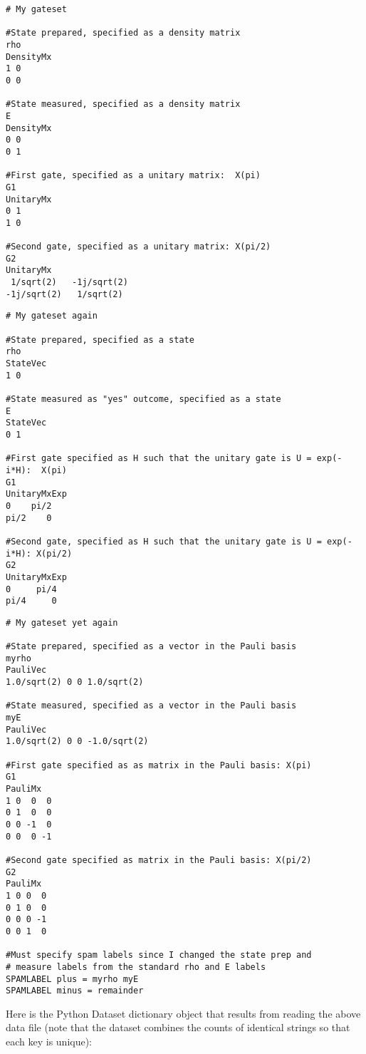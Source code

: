 \documentclass{article}[11pt]
\begin{document}
\begin{itemize}
\begin{lstlisting}[frame=single,caption=First example gate set file]
# My gateset

#State prepared, specified as a density matrix
rho
DensityMx
1 0
0 0

#State measured, specified as a density matrix
E
DensityMx
0 0
0 1

#First gate, specified as a unitary matrix:  X(pi)
G1
UnitaryMx
0 1
1 0

#Second gate, specified as a unitary matrix: X(pi/2)
G2
UnitaryMx
 1/sqrt(2)   -1j/sqrt(2)
-1j/sqrt(2)   1/sqrt(2)
\end{lstlisting}

\begin{lstlisting}[frame=single,caption=Second example gate set file]
# My gateset again

#State prepared, specified as a state
rho
StateVec
1 0

#State measured as "yes" outcome, specified as a state
E
StateVec
0 1

#First gate specified as H such that the unitary gate is U = exp(-i*H):  X(pi)
G1
UnitaryMxExp
0    pi/2
pi/2    0

#Second gate, specified as H such that the unitary gate is U = exp(-i*H): X(pi/2)
G2
UnitaryMxExp
0     pi/4
pi/4     0
\end{lstlisting}

\begin{lstlisting}[frame=single,caption=Third example gate set file]
# My gateset yet again

#State prepared, specified as a vector in the Pauli basis
myrho
PauliVec
1.0/sqrt(2) 0 0 1.0/sqrt(2)

#State measured, specified as a vector in the Pauli basis
myE
PauliVec
1.0/sqrt(2) 0 0 -1.0/sqrt(2)

#First gate specified as as matrix in the Pauli basis: X(pi)
G1
PauliMx
1 0  0  0
0 1  0  0
0 0 -1  0
0 0  0 -1

#Second gate specified as matrix in the Pauli basis: X(pi/2)
G2
PauliMx
1 0 0  0
0 1 0  0
0 0 0 -1
0 0 1  0

#Must specify spam labels since I changed the state prep and 
# measure labels from the standard rho and E labels
SPAMLABEL plus = myrho myE
SPAMLABEL minus = remainder
\end{lstlisting}


\end{itemize}

Here is the Python Dataset dictionary object that results from reading the above data file (note that the dataset combines the counts of identical strings so that each key is unique):
\end{document}
